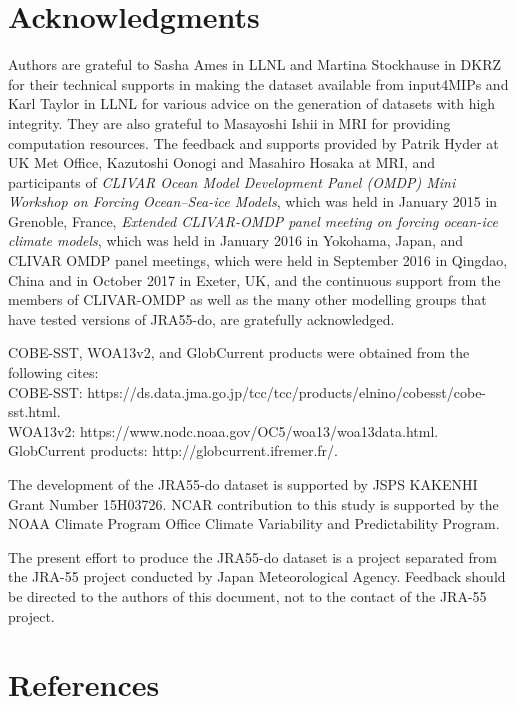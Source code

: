 \documentclass[dvipdfmx]{elsarticle_mod}
\begin{document}
\section*{Acknowledgments}

Authors are grateful to Sasha Ames in LLNL and Martina Stockhause in DKRZ for their technical supports in making the dataset available from input4MIPs and Karl Taylor in LLNL for various advice on the generation of datasets with high integrity. They are also grateful to Masayoshi Ishii in MRI for providing computation resources. The feedback and supports provided by Patrik Hyder at UK Met Office, Kazutoshi Oonogi and Masahiro Hosaka at MRI, and participants of \textit{CLIVAR Ocean Model Development Panel (OMDP) Mini Workshop on Forcing Ocean--Sea-ice Models}, which was held in January 2015 in Grenoble, France, \textit{Extended CLIVAR-OMDP panel meeting on forcing ocean-ice climate models}, which was held in January 2016 in Yokohama, Japan, and CLIVAR OMDP panel meetings, which were held in September 2016 in Qingdao, China and in October 2017 in Exeter, UK, and the continuous support from the members of CLIVAR-OMDP as well as the many other modelling groups that have tested versions of JRA55-do, are gratefully acknowledged.

COBE-SST, WOA13v2, and GlobCurrent products were obtained from the following cites:\\
 \hspace*{3zw} COBE-SST: https://ds.data.jma.go.jp/tcc/tcc/products/elnino/cobesst/cobe-sst.html.\\
 \hspace*{3zw} WOA13v2: https://www.nodc.noaa.gov/OC5/woa13/woa13data.html.\\
 \hspace*{3zw} GlobCurrent products: http://globcurrent.ifremer.fr/.

The development of the JRA55-do dataset is supported by JSPS KAKENHI Grant Number 15H03726. NCAR contribution to this study is supported by the NOAA Climate Program Office Climate Variability and Predictability Program.

The present effort to produce the JRA55-do dataset is a project separated from the JRA-55 project conducted by Japan Meteorological Agency. Feedback should be directed to the authors of this document, not to the contact of the JRA-55 project.


\section*{References}


\end{document}

